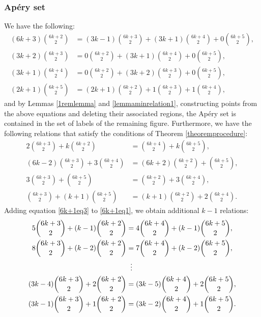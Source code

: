 \documentclass[12pt]{article}
\theoremstyle{remark}
\begin{document}
\subsubsection{Ap{\'e}ry set}
We have the following:
\begin{align}
    (6k+3)\binom{6k+2}{2} &= (3k-1)\binom{6k+3}{2} + (3k+1)\binom{6k+4}{2} + 0\binom{6k+5}{2}, \label{6k+1minrelation0} \\
    (3k+2)\binom{6k+3}{2} &= 0\binom{6k+2}{2} + (3k+1)\binom{6k+4}{2} + 0\binom{6k+5}{2}, \label{6k+1minrelation1} \\
    (3k+1)\binom{6k+4}{2} &= 0\binom{6k+2}{2} + (3k+2)\binom{6k+3}{2} + 0\binom{6k+5}{2}, \label{6k+1minrelation2} \\
    (2k+1)\binom{6k+5}{2} &= (2k+1)\binom{6k+2}{2} + 1\binom{6k+3}{2} + 1\binom{6k+4}{2}, \label{6k+1minrelation3} 
\end{align}
and by Lemmas \ref{1remlemma} and \ref{lemmaminrelation1}, constructing points from the above equations and deleting their associated regions, the Ap{\'e}ry set is contained in the set of labels of the remaining figure.
Furthermore, we have the following relations that satisfy the conditions of Theorem \ref{theoremprocedure}:
\begin{align}
      2 \binom{6k+3}{2} + k \binom{6k+2}{2} &= \binom{6k+4}{2} + k\binom{6k+5}{2}, \label{6k+1eq1}\\
  (6k-2)\binom{6k+3}{2} + 3\binom{6k+4}{2}  &= (6k+2)\binom{6k+2}{2} +  \binom{6k+5}{2} , \label{6k+1eq2}\\
     3\binom{6k+3}{2} + \binom{6k+5}{2} &= \binom{6k+2}{2} + 3 \binom{6k+4}{2}, \label{6k+1eq3} \\
      \binom{6k+3}{2} + (k+1)\binom{6k+5}{2} &= (k+1)\binom{6k+2}{2} + 2 \binom{6k+4}{2}. \label{6k+1eq31}
\end{align}
Adding equation \eqref{6k+1eq3} to \eqref{6k+1eq1}, we obtain additional $k-1$ relations:
\begin{equation}\label{6k+1_k-1equations_1}
\begin{aligned}    
 5 \binom{6k+3}{2} + (k-1) \binom{6k+2}{2} &= 4\binom{6k+4}{2} + (k-1)\binom{6k+5}{2},\\
8 \binom{6k+3}{2} + (k-2) \binom{6k+2}{2} &= 7\binom{6k+4}{2} + (k-2)\binom{6k+5}{2},\\
 & \hspace{5.6pt}  \vdots      \\
(3k-4) \binom{6k+3}{2} + 2 \binom{6k+2}{2} &= (3k-5)\binom{6k+4}{2} + 2\binom{6k+5}{2}, \\
(3k-1) \binom{6k+3}{2} + 1 \binom{6k+2}{2} &= (3k-2)\binom{6k+4}{2} + 1\binom{6k+5}{2}.
\end{aligned}
\end{equation}
\end{document}
